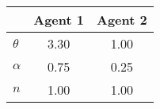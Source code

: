 \begin{tiny}\begin{tabular}{|l|c|c|}
\hline
&\textbf{Agent 1}&\textbf{Agent 2}\\\hline
\textbf{$\theta$}&3.30&1.00\\\hline
\textbf{$\alpha$}&0.75&0.25\\\hline
\textbf{$n$}&1.00&1.00\\\hline
\end{tabular}
\end{tiny}